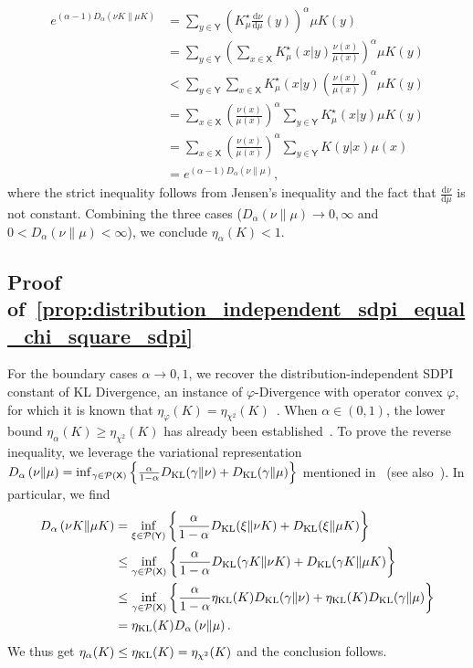 \documentclass[conference,letterpaper]{IEEEtran}
\def \X{\mathsf X}
\def \Y{\mathsf Y}
\def \calP{\mathcal P}
\def \dualK{K^\star_\mu}
\newcommand{\renyiDiv}[2]{D_{\alpha}\left(#1\|#2\right)}
\newcommand{\dd}[1]{\mathrm{d}#1}
\begin{document}
\begin{itemize}
        \begin{align*}
            e^{(\alpha-1)\renyiDiv{\nu K}{\mu K}} &= \sum_{y\in\Y}\left(\dualK\frac{\dd\nu}{\dd\mu}(y)\right)^\alpha\mu K(y)\\
            &= \sum_{y\in\Y}\left(\sum_{x\in\X}\dualK(x|y)\frac{\nu(x)}{\mu(x)}\right)^\alpha\mu K(y)\\
            &<\sum_{y\in\Y}\sum_{x\in\X}\dualK(x|y)\left(\frac{\nu(x)}{\mu(x)}\right)^\alpha\mu K(y)\\
            &= \sum_{x\in\X}\left(\frac{\nu(x)}{\mu(x)}\right)^\alpha\sum_{y\in\Y}\dualK(x|y)\mu K(y)\\
            &=\sum_{x\in\X}\left(\frac{\nu(x)}{\mu(x)}\right)^\alpha\sum_{y\in\Y}K(y|x)\mu (x)\\
            &= e^{(\alpha-1)\renyiDiv{\nu}{\mu}},
        \end{align*}
        where the strict inequality follows from Jensen's inequality and the fact that $\frac{\dd\nu}{\dd\mu}$ is not constant. Combining the three cases ($\renyiDiv{\nu}{\mu}\to0,\infty$ and $0<\renyiDiv{\nu}{\mu}<\infty$), we conclude $\eta_\alpha(K)<1$.
    \end{itemize}
\subsection{Proof of~\cref{prop:distribution_independent_sdpi_equal_chi_square_sdpi}}\label{appendix:proof_distribution_independent_sdpi_equal_chi_square_sdpi}\noindent
    For the boundary cases ${\alpha\to0,1}$, we recover the distribution-independent SDPI constant of KL Divergence, an instance of $\varphi$-Divergence with operator convex $\varphi$, for which it is known that $\eta_{\varphi}(K)=\eta_{\chi^2}(K)$~\cite[Corollary III.1]{raginsky2016strong}. When $\alpha\in(0,1)$, the lower bound $\eta_\alpha(K)\geq \eta_{\chi^2}(K)$ has already been established~\cite[Corollary 2]{jin2024properties}. To prove the reverse inequality, we leverage the variational representation ${\renyiDiv{\nu}{\mu} = \inf_{\gamma\in\calP(\X)} \left\{\frac{\alpha}{1-\alpha}D_{\rm KL}(\gamma\|\nu) + D_{\rm KL}(\gamma\|\mu)\right\}}$ mentioned in~\cite[Theorem 30]{van2014renyi} (see also~\cite[Lemma II.1]{espositoGI2025sibson}). In particular, we find
    \begin{align*}
        \renyiDiv{\nu K}{\mu K} &=\inf_{\xi\in\calP(\Y)} \left\{\frac{\alpha}{1-\alpha}D_{\rm KL}(\xi\|\nu K) + D_{\rm KL}(\xi\|\mu K)\right\}\\
        &\leq \inf_{\gamma\in\calP(\X)} \left\{\frac{\alpha}{1-\alpha}D_{\rm KL}(\gamma K\|\nu K) + D_{\rm KL}(\gamma K\|\mu K)\right\}\\
        &\leq \inf_{\gamma\in\calP(\X)} \bigg\{\frac{\alpha}{1-\alpha}\eta_{\rm KL}(K)D_{\rm KL}(\gamma\|\nu) + \eta_{\rm KL}(K)D_{\rm KL}(\gamma\|\mu)\bigg\}\\
        &=\eta_{\rm KL}(K)\renyiDiv{\nu}{\mu}.
    \end{align*}
    We thus get $\eta_\alpha(K)\leq\eta_{\rm KL}(K)=\eta_{\chi^2}(K)$ and the conclusion follows.
\end{document}
